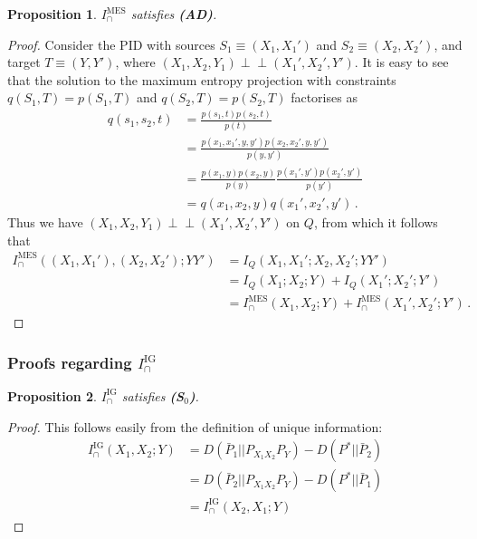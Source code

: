 \documentclass{article}
\newcommand{\ts}[1]{\ensuremath{_{\text{#1}}}}
\newcommand{\ind}{\mathrel{\perp\!\!\!\perp}}
\newcommand{\Sz}{\textbf{(S\ts{0})}\xspace} %
\newcommand{\AD}{\textbf{(AD)}\xspace} %
\newcommand{\IMES}{\ensuremath{I_\cap^{\text{MES}}}\xspace}
\newcommand{\IIG}{\ensuremath{I_\cap^{\text{IG}}}\xspace}
\newcommand{\IIGs}{\ensuremath{I_\cap^{\text{IG}}(X_1,X_2;Y)}\xspace}
\newtheorem{proposition}{Proposition}
\begin{document}
\begin{proposition} \label{prop:MES-AD}
    $\IMES$ satisfies \AD.
\end{proposition}
\begin{proof}
    Consider the PID with sources $S_1\equiv(X_1,X_1')$ and $S_2\equiv(X_2,X_2')$, and target $T\equiv(Y,Y')$, where $(X_1,X_2,Y_1)\ind(X_1',X_2',Y')$. It is easy to see that the solution to the maximum entropy projection with constraints $q(S_1,T)=p(S_1,T)$ and $q(S_2,T)=p(S_2,T)$ factorises as
    \begin{equation}
        \begin{aligned}
            q(s_1,s_2,t) & = \frac {p(s_1,t)p(s_2,t)}{p(t)} \\
            & = \frac{p(x_1,x_1',y,y')p(x_2,x_2',y,y')}{p(y,y')} \\
            & = \frac{p(x_1,y)p(x_2,y)}{p(y)}\frac{p(x_1',y')p(x_2',y')}{p(y')} \\
            & = q(x_1,x_2,y) q(x_1',x_2',y') \,.
        \end{aligned}
    \end{equation}
    Thus we have $(X_1,X_2,Y_1)\ind(X_1',X_2',Y')$ on $Q$, from which it follows that 
    \begin{equation}
        \begin{aligned}
            \IMES((X_1,X_1'),(X_2,X_2');YY') & = I_Q(X_1,X_1';X_2,X_2';YY') \\
            & = I_Q(X_1;X_2;Y) +I_Q(X_1';X_2';Y') \\
            & = \IMES(X_1,X_2;Y) +\IMES(X_1',X_2';Y') \,.
        \end{aligned}
    \end{equation}
\end{proof}


\subsubsection{Proofs regarding \IIG}

\begin{proposition} \label{prop:IG-Sz}
    $\IIG$ satisfies \Sz.
\end{proposition}
\begin{proof}
    This follows easily from the definition of unique information:
    \begin{equation}
    \begin{aligned}
        \IIGs & = D(\bar{P}_1||P_{X_1 X_2}P_Y)-D(P^*||\bar{P}_2) \\
        & = D(\bar{P}_2||P_{X_1 X_2}P_Y)-D(P^*||\bar{P}_1) \\
        & = \IIG(X_2,X_1;Y)
    \end{aligned}
    \end{equation}
\end{proof}
\end{document}
